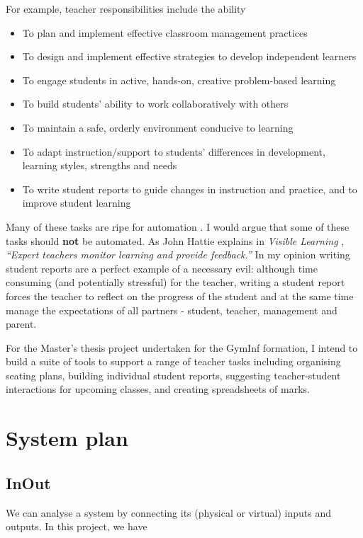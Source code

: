 \documentclass[10pt]{article}
\begin{document}
For example, teacher responsibilities include the ability
\begin{itemize}
\item To plan and implement effective classroom management practices
\item To design and implement effective strategies to develop independent learners
\item To engage students in active, hands-on, creative problem-based learning
\item To build students’ ability to work collaboratively with others
\item To maintain a safe, orderly environment conducive to learning
\item To adapt instruction/support to students’ differences in development, learning styles, strengths and needs
\item To write student reports to guide changes in instruction and practice, and to improve student learning
\end{itemize}

Many of these tasks are ripe for automation \cite{Swei15}. I would argue that some of these tasks should \textbf{not} be automated. As John Hattie explains in \emph{Visible Learning} \cite{Hat12}, \emph{``Expert teachers monitor learning and provide feedback.''} In my opinion writing student reports are a perfect example of a necessary evil: although time consuming (and potentially stressful) for the teacher, writing a student report forces the teacher to reflect on the progress of the student and at the same time manage the expectations of all partners - student, teacher, management and parent.

For the Master's thesis project undertaken for the GymInf formation, I intend to build a suite of tools to support a range of teacher tasks including organising seating plans, building individual student reports, suggesting teacher-student interactions for upcoming classes, and creating spreadsheets of marks.

\section{System plan}

\subsection{InOut}

We can analyse a system by connecting its (physical or virtual) inputs and outputs. In this project, we have
\end{document}
